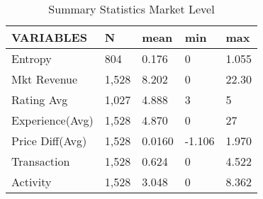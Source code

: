 \begin{table}
\centering
\begin{tabular}{@{}lllll@{}}
\toprule
VARIABLES       & N     & mean   & min    & max   \\ \midrule
Entropy         & 804   & 0.176  & 0      & 1.055 \\
Mkt Revenue     & 1,528 & 8.202  & 0      & 22.30 \\
Rating Avg      & 1,027 & 4.888  & 3      & 5     \\
Experience(Avg) & 1,528 & 4.870  & 0      & 27    \\
Price Diff(Avg) & 1,528 & 0.0160 & -1.106 & 1.970 \\
Transaction     & 1,528 & 0.624  & 0      & 4.522 \\
Activity        & 1,528 & 3.048  & 0      & 8.362 \\ \bottomrule
\end{tabular}
\caption{Summary Statistics Market Level}
\label{sumstats_mkt}
\end{table}